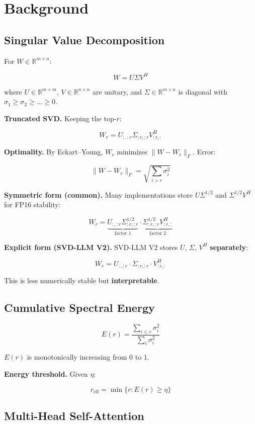 
\section{Background}

\subsection{Singular Value Decomposition}

For $W \in \mathbb{R}^{m \times n}$:

\[
W = U \Sigma V^H
\tag{3.1}
\]

where $U \in \mathbb{R}^{m \times m}$, $V \in \mathbb{R}^{n \times n}$ are 
unitary, and $\Sigma \in \mathbb{R}^{m \times n}$ is diagonal with 
$\sigma_1 \geq \sigma_2 \geq \dots \geq 0$.

\textbf{Truncated SVD.} Keeping the top-$r$:

\[
W_r = U_{:, :r} \Sigma_{:r, :r} V_{:r, :}^H
\tag{3.2}
\]

\textbf{Optimality.} By Eckart--Young, $W_r$ minimizes $\|W - W_r\|_F$. Error:

\[
\|W - W_r\|_F = \sqrt{\sum_{i > r} \sigma_i^2}
\tag{3.3}
\]

\textbf{Symmetric form (common).} Many implementations store $U\Sigma^{1/2}$ and 
$\Sigma^{1/2}V^H$ for FP16 stability:

\[
W_r = \underbrace{U_{:, :r}\Sigma_{:r, :r}^{1/2}}_{\text{factor 1}} \cdot \underbrace{\Sigma_{:r, :r}^{1/2}V_{:r, :}^H}_{\text{factor 2}}
\tag{3.4}
\]

\textbf{Explicit form (SVD-LLM V2).} SVD-LLM V2 stores $U$, $\Sigma$, $V^H$ 
\textbf{separately}:

\[
W_r = U_{:, :r} \cdot \Sigma_{:r, :r} \cdot V_{:r, :}^H
\tag{3.5}
\]

This is less numerically stable but \textbf{interpretable}.

\subsection{Cumulative Spectral Energy}

\[
E(r) = \frac{\sum_{i \leq r} \sigma_i^2}{\sum_i \sigma_i^2}
\tag{3.6}
\]

$E(r)$ is monotonically increasing from $0$ to $1$.

\textbf{Energy threshold.} Given $\eta$:

\[
r_\text{eff} = \min\{r : E(r) \geq \eta\}
\tag{3.7}
\]

\subsection{Multi-Head Self-Attention}

